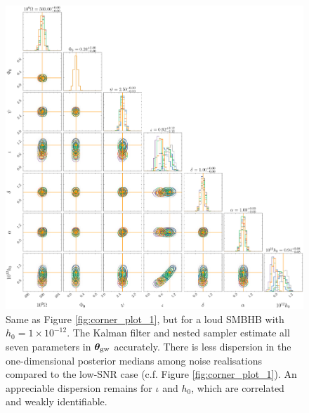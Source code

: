 \documentclass[fleqn,usenatbib,useAMS]{mnras}
\begin{document}
\begin{figure}
	\includegraphics[width=\textwidth, height = \textwidth ]{images/corner_highSNR} 	
	\caption{Same as Figure \ref{fig:corner_plot_1}, but for a loud SMBHB with $h_0 = 1 \times 10^{-12}$. The Kalman filter and nested sampler estimate all seven parameters in $\boldsymbol{\theta}_{\rm gw}$ accurately. There is less dispersion in the  one-dimensional posterior medians among noise realisations compared to the low-SNR case (c.f. Figure \ref{fig:corner_plot_1}). An appreciable dispersion remains for $\iota$ and $h_0$, which are correlated and weakly identifiable.}
	\label{fig:corner_high_snr_appendix}
\end{figure}
\end{document}
